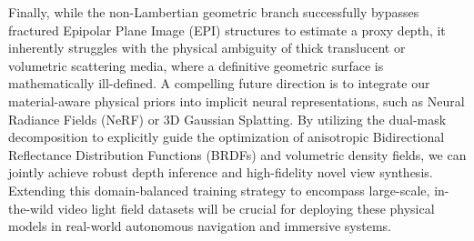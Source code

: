Finally, while the non-Lambertian geometric branch successfully bypasses fractured Epipolar Plane Image (EPI) structures to estimate a proxy depth, it inherently struggles with the physical ambiguity of thick translucent or volumetric scattering media, where a definitive geometric surface is mathematically ill-defined. A compelling future direction is to integrate our material-aware physical priors into implicit neural representations, such as Neural Radiance Fields (NeRF) or 3D Gaussian Splatting. By utilizing the dual-mask decomposition to explicitly guide the optimization of anisotropic Bidirectional Reflectance Distribution Functions (BRDFs) and volumetric density fields, we can jointly achieve robust depth inference and high-fidelity novel view synthesis. Extending this domain-balanced training strategy to encompass large-scale, in-the-wild video light field datasets will be crucial for deploying these physical models in real-world autonomous navigation and immersive systems.